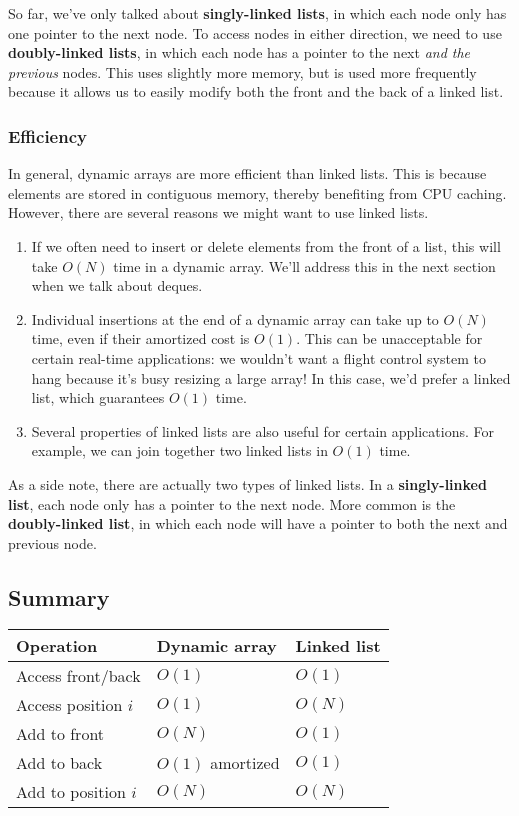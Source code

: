 So far, we've only talked about \textbf{singly-linked lists}, in which each node only has one pointer to the next node. To access nodes in either direction, we need to use \textbf{doubly-linked lists}, in which each node has a pointer to the next \textit{and the previous} nodes. This uses slightly more memory, but is used more frequently because it allows us to easily modify both the front and the back of a linked list.

\subsubsection{Efficiency}
In general, dynamic arrays are more efficient than linked lists. This is because elements are stored in contiguous memory, thereby benefiting from CPU caching. However, there are several reasons we might want to use linked lists.

\begin{enumerate}
    \item If we often need to insert or delete elements from the front of a list, this will take $O(N)$ time in a dynamic array. We'll address this in the next section when we talk about deques.
    \item Individual insertions at the end of a dynamic array can take up to $O(N)$ time, even if their amortized cost is $O(1)$. This can be unacceptable for certain real-time applications: we wouldn't want a flight control system to hang because it's busy resizing a large array! In this case, we'd prefer a linked list, which guarantees $O(1)$ time.
    \item Several properties of linked lists are also useful for certain applications. For example, we can join together two linked lists in $O(1)$ time.
\end{enumerate}

As a side note, there are actually two types of linked lists. In a \textbf{singly-linked list}, each node only has a pointer to the next node. More common is the \textbf{doubly-linked list}, in which each node will have a pointer to both the next and previous node.

\subsection{Summary}

\begin{tabular}{| l | l | l |} \hline
    \textbf{Operation}           & \textbf{Dynamic array}    & \textbf{Linked list}  \\ \hline
    Access front/back   & $O(1)$           & $O(1)$       \\ \hline
    Access position $i$ & $O(1)$           & $O(N)$       \\ \hline
    Add to front        & $O(N)$           & $O(1)$       \\ \hline
    Add to back         & $O(1)$ amortized & $O(1)$       \\ \hline
    Add to position $i$ & $O(N)$           & $O(N)$       \\ \hline
\end{tabular}




